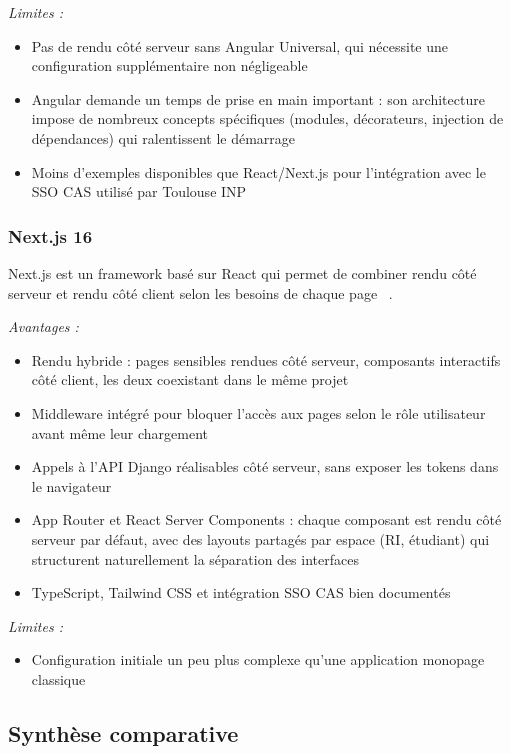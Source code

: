 \textit{Limites :}
\begin{itemize}
  \item Pas de rendu côté serveur sans
        Angular Universal, qui nécessite
        une configuration supplémentaire
        non négligeable
  \item Angular demande un temps de prise en main
        important : son architecture impose
        de nombreux concepts spécifiques
        (modules, décorateurs, injection de
        dépendances) qui ralentissent
        le démarrage
  \item Moins d'exemples disponibles que
        React/Next.js pour l'intégration
        avec le SSO CAS utilisé
        par Toulouse INP
\end{itemize}

\subsubsection{Next.js 16}

Next.js est un framework basé sur React qui permet de combiner rendu côté serveur
et rendu côté client selon les besoins de chaque page ~\cite{nextjs_dev}.

\textit{Avantages :}
\begin{itemize}
  \item Rendu hybride : pages sensibles rendues côté serveur, composants
        interactifs côté client, les deux coexistant dans le même projet
  \item Middleware intégré pour bloquer l'accès aux pages selon le rôle
        utilisateur avant même leur chargement
  \item Appels à l'API Django réalisables côté serveur, sans exposer
        les tokens dans le navigateur
  \item App Router et React Server Components : chaque composant est rendu
        côté serveur par défaut, avec des layouts partagés par espace
        (RI, étudiant) qui structurent naturellement la séparation des interfaces
  \item TypeScript, Tailwind CSS et intégration SSO CAS bien documentés
\end{itemize}

\textit{Limites :}
\begin{itemize}
  \item Configuration initiale un peu plus complexe qu'une application
        monopage classique
\end{itemize}

\subsection{Synthèse comparative}

